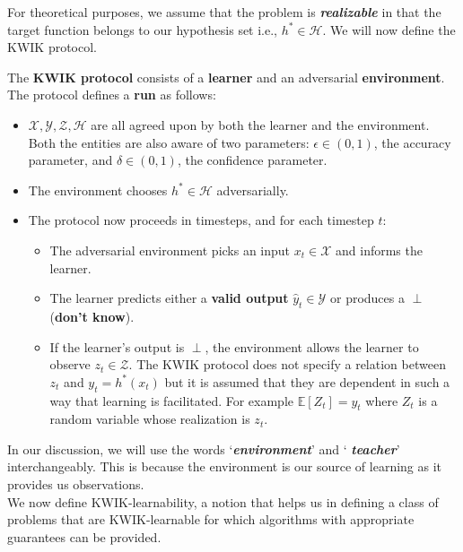 For theoretical purposes, we assume that the problem is \textit{\textbf{realizable}} in that the target function belongs to our hypothesis set i.e., $h^* \in \mathcal{H}$. We will now define the KWIK protocol.
\begin{dfn}
The \textbf{KWIK protocol} consists of a \textbf{learner} and an adversarial \textbf{environment}. 
The protocol defines a \textbf{run} as follows:
\begin{itemize}
\item $\mathcal{X}, \mathcal{Y}, \mathcal{Z}, \mathcal{H}$ are all agreed upon by both the learner and the environment. Both the entities are also aware of two parameters: $\epsilon \in (0,1)$, the accuracy parameter, and $\delta \in (0,1)$, the confidence parameter.
\item The environment chooses $h^* \in \mathcal{H}$ adversarially.
\item The protocol now proceeds in timesteps, and for each timestep $t$:
\begin{itemize}
\item The adversarial environment picks an input $x_t  \in \mathcal{X}$ and informs the learner. 
\item The learner predicts either a \textbf{valid output}  $\hat{y}_t \in \mathcal{Y}$ or produces a $\perp$ (\textbf{don't know}).
\item If the learner's output is $\perp$, the environment allows the learner to observe $z_t \in \mathcal{Z}$. The KWIK protocol does not specify a relation between $z_t$ and $y_t = h^*(x_t)$ but it is assumed that they are dependent in such a way that learning is facilitated. For example $\mathbb{E}[Z_t] = y_t$ where $Z_t$ is a random variable whose realization is  $z_t$.
\end{itemize}
\end{itemize}
\end{dfn}

In our discussion, we will use the words `\textbf{\textit{environment}}' and ` \textbf{\textit{teacher}}' interchangeably. This is because the environment is our source of learning as it provides us observations. \\ 

We now define KWIK-learnability, a notion that helps us in defining a class of problems that are KWIK-learnable for which algorithms with appropriate guarantees can be provided. 

